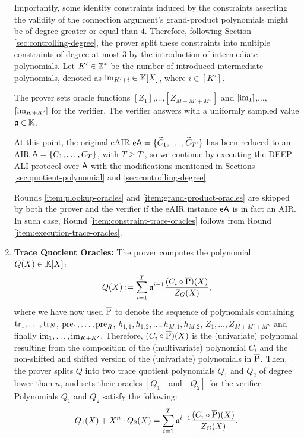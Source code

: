 \begin{protocol}
\begin{enumerate}
  Importantly, some identity constraints induced by the constraints asserting the validity of the connection argument's grand-product polynomials might be of degree greater or equal than $4$. Therefore, following Section \ref{sec:controlling-degree}, the prover split these constraints into multiple constraints of degree at most $3$ by the introduction of intermediate polynomials. Let $K' \in \mathbb{Z}^*$ be the number of introduced intermediate polynomials, denoted as $\text{im}_{K'+i} \in \mathbb{K}[X]$, where $i \in [K']$. 
  
  The prover sets oracle functions $[Z_1]$,$\dots$,$[Z_{M+M'+M''}]$ and $[\text{im}_1]$,$\dots$,$[\text{im}_{K+K'}]$ for the verifier. The verifier answers with a uniformly sampled value $\mathfrak{a} \in \mathbb{K}$. \label{item:grand-product-oracles}
  
  At this point, the original eAIR $\textsf{eA} = \{\widetilde{C}_1,\dots,\widetilde{C}_{T'}\}$ has been reduced to an AIR $\textsf{A} = \{C_1,\dots,C_T\}$, with $T \geq T'$, so we continue by executing the DEEP-ALI protocol over $\textsf{A}$ with the modifications mentioned in Sections \ref{sec:quotient-polynomial} and \ref{sec:controlling-degree}. 
  \begin{bremark}
    Rounds \ref{item:plookup-oracles} and \ref{item:grand-product-oracles} are skipped by both the prover and the verifier if the eAIR instance $\textsf{eA}$ is in fact an AIR. In such case, Round \ref{item:constraint-trace-oracles} follows from Round \ref{item:execution-trace-oracles}.
  \end{bremark}

  \item \textbf{Trace Quotient Oracles:} The prover computes the polynomial $Q(X) \in \mathbb{K}[X]$:
  \[
    Q(X) := \sum_{i=1}^T \mathfrak{a}^{i-1} \frac{(C_i \circ \overline{\text{P}})(X)}{Z_G(X)},
  \]
  where we have now used $\overline{\text{P}}$ to denote the sequence of polynomials containing $\text{tr}_1,\dots,\text{tr}_N$, $\text{pre}_1,\dots,\text{pre}_R$, $h_{1,1},h_{1,2},\dots,h_{M,1},h_{M,2}$, $Z_1,\dots,Z_{M+M'+M''}$ and finally $\text{im}_1,\dots,\text{im}_{K+K'}$. Therefore, $(C_i \circ \overline{\text{P}})(X)$ is the (univariate) polynomal resulting from the composition of the (multivariate) polynomial $C_i$ and the non-shifted and shifted version of the (univariate) polynomials in $\overline{\text{P}}$. Then, the prover splits $Q$ into two trace quotient polynomials $Q_1$ and $Q_2$ of degree lower than $n$, and sets their oracles $[Q_1]$ and $[Q_2]$ for the verifier. Polynomials $Q_1$ and $Q_2$ satisfy the following:
  \begin{equation}\label{eq:ali-check}
    Q_1(X) + X^n \cdot Q_2(X) = \sum_{i=1}^T \mathfrak{a}^{i-1} \frac{(C_i \circ \overline{\text{P}})(X)}{Z_G(X)}.
  \end{equation}
   \label{item:constraint-trace-oracles}


\end{enumerate}
\end{protocol}
